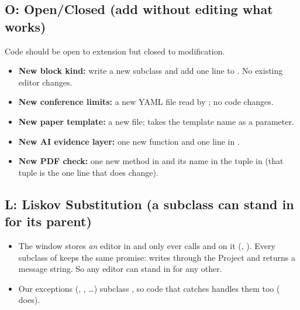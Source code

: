 \subsection*{O: Open/Closed (add without editing what works)}
Code should be open to extension but closed to modification.
\begin{itemize}
\item \textbf{New block kind:} write a new  subclass and add one line to \hyperref[u:ui/editors:editor_for]{}. No existing editor changes.
\item \textbf{New conference limits:} a new YAML file read by \hyperref[u:models:Rules.load]{}; no code changes.
\item \textbf{New paper template:} a new  file; \hyperref[u:renderer:render]{} takes the template name as a parameter.
\item \textbf{New AI evidence layer:} one new function and one line in \hyperref[u:images:inspect_file]{}.
\item \textbf{New PDF check:} one new method in  and its name in the tuple in \hyperref[u:checks:PdfChecks.run]{} (that tuple is the one line that does change).
\end{itemize}

\subsection*{L: Liskov Substitution (a subclass can stand in for its parent)}
\begin{itemize}
\item The window stores \emph{an} editor in  and only ever calls  and  on it (\hyperref[u:ui/window:MainWindow.save_editor]{}, \hyperref[u:ui/window:MainWindow.make_editor]{}). Every subclass of \hyperref[u:ui/editors:Editor]{} keeps the same promise:  writes through the Project and returns a message string. So any editor can stand in for any other.
\item Our exceptions (, , \dots) subclass , so code that catches  handles them too (\hyperref[u:ui/window:MainWindow.run]{} does).
\end{itemize}

